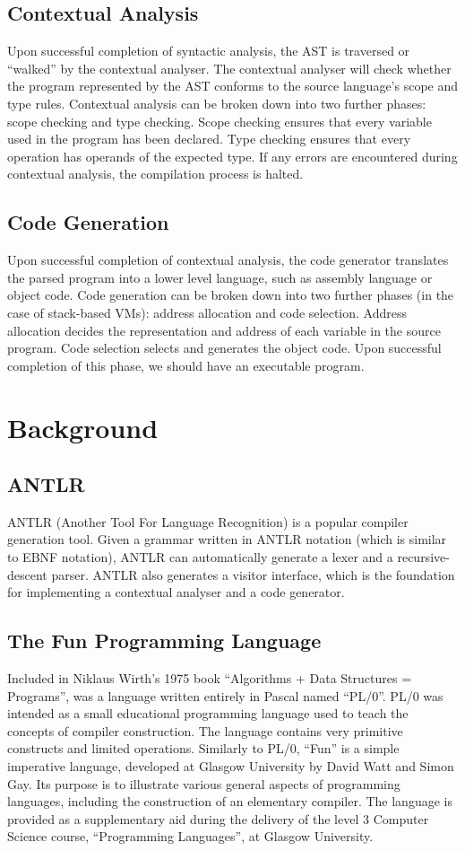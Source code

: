 \documentclass{l4proj}
\begin{document}
\subsection{Contextual Analysis}
Upon successful completion of syntactic analysis, the AST is traversed or ``walked'' by the contextual analyser. The contextual analyser will check whether the program represented by the AST conforms to the source language's scope and type rules. Contextual analysis can be broken down into two further phases: scope checking and type checking. Scope checking ensures that every variable used in the program has been declared. Type checking ensures that every operation has operands of the expected type. If any errors are encountered during contextual analysis, the compilation process is halted.

\subsection{Code Generation}
Upon successful completion of contextual analysis, the code generator translates the parsed program into a lower level language, such as assembly language or object code. Code generation can be broken down into two further phases (in the case of stack-based VMs): address allocation and code selection. Address allocation decides the representation and address of each variable in the source program. Code selection selects and generates the object code. Upon successful completion of this phase, we should have an executable program.

\section{Background}
\subsection{ANTLR}
ANTLR (Another Tool For Language Recognition) is a popular compiler generation tool. Given a grammar written in ANTLR notation (which is similar to EBNF notation), ANTLR can automatically generate a lexer and a recursive-descent parser. ANTLR also generates a visitor interface, which is the foundation for implementing a contextual analyser and a code generator. 

\subsection{The Fun Programming Language}
Included in Niklaus Wirth's 1975 book ``Algorithms + Data Structures = Programs'', was a language written entirely in Pascal named ``PL/0''. PL/0 was intended as a small educational programming language used to teach the concepts of compiler construction. The language contains very primitive constructs and limited operations. Similarly to PL/0, ``Fun'' is a simple imperative language, developed at Glasgow University by David Watt and Simon Gay. Its purpose is to illustrate various general aspects of programming languages, including the construction of an elementary compiler. The language is provided as a supplementary aid during the delivery of the level 3 Computer Science course, ``Programming Languages'', at Glasgow University.
\end{document}

